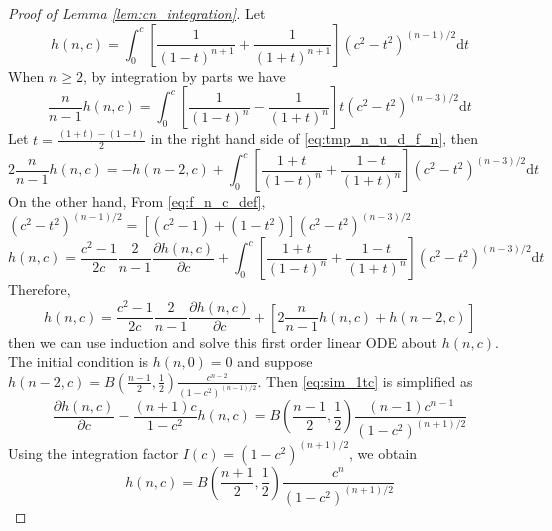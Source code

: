 \documentclass[conference,a4paper]{IEEEtran}
\def\d{\mathrm{d}}
\begin{document}
\begin{proof}[Proof of Lemma \ref{lem:cn_integration}]
     Let
\begin{equation}\label{eq:f_n_c_def}
h(n,c)=   \int_0^{c}
    [\frac{1}{(1-t)^{n+1}}+\frac{1}{(1+t)^{n+1}}]
    (c^2- t^2)^{(n-1)/2}\d t
\end{equation}
When $n\geq 2$, by integration by parts 
we have 
\begin{equation}\label{eq:tmp_n_u_d_f_n}
    \frac{n}{n-1}h(n,c)
    =\int_0^{c}
    \left[\frac{1}{(1-t)^{n}}
    -\frac{1}{(1+t)^{n}}
    \right]
    t(c^2- t^2)^{(n-3)/2}
    \d t
\end{equation}
Let $t=\frac{(1+t)-(1-t)}{2}$ in the right hand side
of \eqref{eq:tmp_n_u_d_f_n}, then
\begin{equation}
    2\frac{n}{n-1}h(n,c)
=    -h(n-2,c)  
+ \int_0^{c}
\left[\frac{1+t}{(1-t)^{n}}
+\frac{1-t}{(1+t)^{n}}
\right]
(c^2- t^2)^{(n-3)/2}
\d t
\end{equation}
On the other hand,
From \eqref{eq:f_n_c_def},
$(c^2-t^2)^{(n-1)/2}
=[(c^2-1)+(1-t^2)](c^2-t^2)^{(n-3)/2}$
\begin{equation}
    h(n, c) = \frac{c^2-1}{2c}\frac{2}{n-1}\frac{\partial h(n,c)}{\partial c}
    +  \int_0^{c}
    \left[\frac{1+t}{(1-t)^{n}}
    +\frac{1-t}{(1+t)^{n}}
    \right]
    (c^2- t^2)^{(n-3)/2}
    \d t
\end{equation}
Therefore,
\begin{equation}\label{eq:sim_1tc}
    h(n,c)=\frac{c^2-1}{2c}\frac{2}{n-1}\frac{\partial h(n,c)}{\partial c}
    + [2\frac{n}{n-1} h(n,c) + h(n-2, c)]
\end{equation}
then we can use induction and solve this
first order linear ODE about $h(n,c)$.
The initial condition is $h(n,0)=0$ and
suppose
$h(n-2,c)=B(\frac{n-1}{2}, \frac{1}{2})
\frac{c^{n-2}}{(1-c^2)^{(n-1)/2}}$.
Then \eqref{eq:sim_1tc} is simplified as
\begin{equation}
    \frac{\partial h(n,c)}{\partial c}
    - \frac{(n+1)c}{1-c^2} h(n,c)
    = B(\frac{n-1}{2}, \frac{1}{2})\frac{(n-1)c^{n-1}}{(1-c^2)^{(n+1)/2}}
\end{equation}
Using the integration factor $I(c)=(1-c^2)^{(n+1)/2}$, we obtain
\begin{equation}\label{eq:f_n_c_expression}
    h(n,c)= B(\frac{n+1}{2}, \frac{1}{2})
    \frac{c^n}{(1-c^2)^{(n+1)/2}}
\end{equation}

\end{proof}
\end{document}
